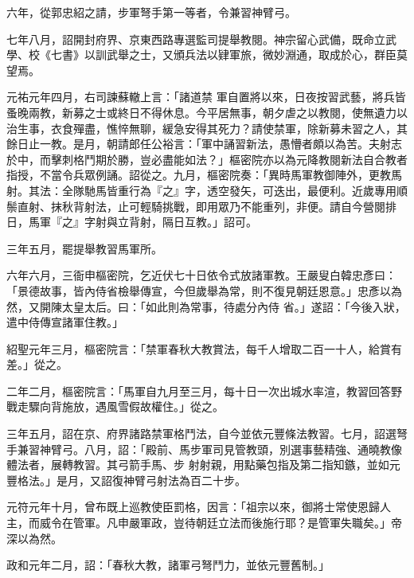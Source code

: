 \begin{pinyinscope}
 六年，從郭忠紹之請，步軍弩手第一等者，令兼習神臂弓。



 七年八月，詔開封府界、京東西路專選監司提舉教閱。神宗留心武備，既命立武學、校《七書》以訓武舉之士，又頒兵法以肄軍旅，微妙淵通，取成於心，群臣莫望焉。



 元祐元年四月，右司諫蘇轍上言：「諸道禁
 軍自置將以來，日夜按習武藝，將兵皆蚤晚兩教，新募之士或終日不得休息。今平居無事，朝夕虐之以教閱，使無遺力以治生事，衣食殫盡，憔悴無聊，緩急安得其死力？請使禁軍，除新募未習之人，其餘日止一教。是月，朝請郎任公裕言：「軍中誦習新法，愚懵者頗以為苦。夫射志於中，而擊刺格鬥期於勝，豈必盡能如法？」樞密院亦以為元降教閱新法自合教者指授，不當令兵眾例誦。詔從之。九月，樞密院奏：「異時馬軍教御陣外，更教馬
 射。其法：全隊馳馬皆重行為『之』字，透空發矢，可迭出，最便利。近歲專用順鬃直射、抹秋背射法，止可輕騎挑戰，即用眾乃不能重列，非便。請自今營閱排日，馬軍『之』字射與立背射，隔日互教。」詔可。



 三年五月，罷提舉教習馬軍所。



 六年六月，三衙申樞密院，乞近伏七十日依令式放諸軍教。王嚴叟白韓忠彥曰：「景德故事，皆內侍省檢舉傳宣，今但歲舉為常，則不復見朝廷恩意。」忠彥以為然，又開陳太皇太后。曰：「如此則為常事，待處分內侍
 省。」遂詔：「今後入狀，遣中侍傳宣諸軍住教。」



 紹聖元年三月，樞密院言：「禁軍春秋大教賞法，每千人增取二百一十人，給賞有差。」從之。



 二年二月，樞密院言：「馬軍自九月至三月，每十日一次出城水率渲，教習回答野戰走驟向背施放，遇風雪假故權住。」從之。



 三年五月，詔在京、府界諸路禁軍格鬥法，自今並依元豐條法教習。七月，詔選弩手兼習神臂弓。八月，詔：「殿前、馬步軍司見管教頭，別選事藝精強、通曉教像體法者，展轉教習。其弓箭手馬、步
 射射親，用點藥包指及第二指知鏃，並如元豐格法。」是月，又詔復神臂弓射法為百二十步。



 元符元年十月，曾布既上巡教使臣罰格，因言：「祖宗以來，御將士常使恩歸人主，而威令在管軍。凡申嚴軍政，豈待朝廷立法而後施行耶？是管軍失職矣。」帝深以為然。



 政和元年二月，詔：「春秋大教，諸軍弓弩鬥力，並依元豐舊制。」




\end{pinyinscope}
